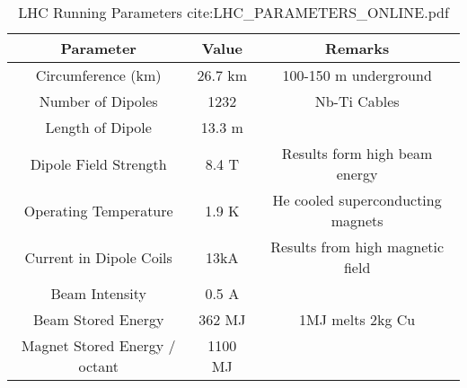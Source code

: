 \begin{center}
\begin{table}[]
\begin{center}
\caption{LHC Running Parameters cite:LHC\_PARAMETERS\_ONLINE.pdf}
\begin{tabular}{ccc}
\textbf{Parameter} & \textbf{Value} & \textbf{Remarks} \\
\hline
Circumference (km) & 26.7 km & 100-150 m underground\\
Number of Dipoles & 1232 & Nb-Ti Cables \\
Length of Dipole & 13.3 m & \\
Dipole Field Strength & 8.4 T & Results form high beam energy \\
Operating Temperature & 1.9 K & He cooled superconducting magnets\\
Current in Dipole Coils & 13kA & Results from high magnetic field \\
Beam Intensity & 0.5 A & \\ 
Beam Stored Energy & 362 MJ & 1MJ melts 2kg Cu \\
Magnet Stored Energy / octant & 1100 MJ & \\
\end{tabular}
\end{center}
\end{table}
\end{center}

